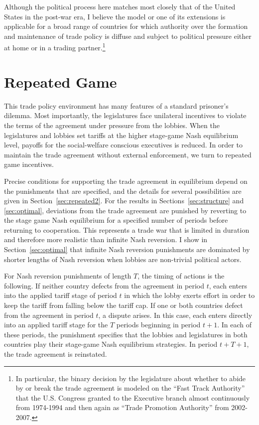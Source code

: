\documentclass[authoryear, review]{elsarticle}
\begin{document}
Although the political process here matches most closely that of the United States in the post-war era, I believe the model or one of its extensions is applicable for a broad range of countries for which authority over the formation and maintenance of trade policy is diffuse and subject to political pressure either at home or in a trading partner.\footnote{In particular, the binary decision by the legislature about whether to abide by or break the trade agreement is modeled on the ``Fast Track Authority'' that the U.S. Congress granted to the Executive branch almost continuously from 1974-1994 and then again as ``Trade Promotion Authority'' from 2002-2007.} 

\section{Repeated Game}
\label{sec:repeated}
This trade policy environment has many features of a standard prisoner's dilemma. Most importantly, the legislatures face unilateral incentives to violate the terms of the agreement under pressure from the lobbies. When the legislatures and lobbies set tariffs at the higher stage-game Nash equilibrium level, payoffs for the social-welfare conscious executives is reduced. In order to maintain the trade agreement without external enforcement, we turn to repeated game incentives.

Precise conditions for supporting the trade agreement in equilibrium depend on the punishments that are specified, and the details for several possibilities are given in Section~\ref{sec:repeated2}. For the results in Sections~\ref{sec:structure} and \ref{sec:optimal}, deviations from the trade agreement are punished by reverting to the stage game Nash equilibrium for a specified number of periods before returning to cooperation. This represents a trade war that is limited in duration and therefore more realistic than infinite Nash reversion. I show in Section~\ref{sec:optimal} that infinite Nash reversion punishments are dominated by shorter lengths of Nash reversion when lobbies are non-trivial political actors.

For Nash reversion punishments of length $T$, the timing of actions is the following. If neither country defects from the agreement in period $t$, each enters into the applied tariff stage of period $t$ in which the lobby exerts effort in order to keep the tariff from falling below the tariff cap. If one or both countries defect from the agreement in period $t$, a dispute arises. In this case, each enters directly into an applied tariff stage for the $T$ periods beginning in period $t+1$. In each of these periods, the punishment specifies that the lobbies and legislatures in both countries play their stage-game Nash equilibrium strategies. In period $t+T+1$, the trade agreement is reinstated.
\end{document}
